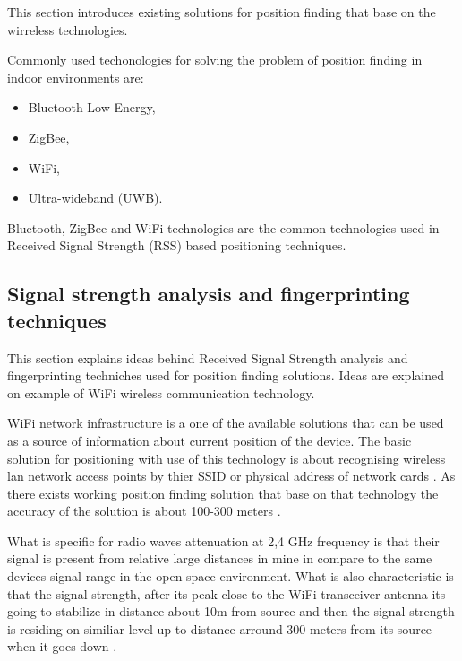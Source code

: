 \documentclass[../main.tex]{subfiles}
\begin{document}
This section introduces existing solutions for position finding that base on the wirreless technologies.

Commonly used techonologies for solving the problem of position finding in indoor environments are\cite{positioning_tests}:
\begin{itemize}
	\item Bluetooth Low Energy,
	\item ZigBee,
	\item WiFi,
	\item Ultra-wideband (UWB).
\end{itemize}

Bluetooth, ZigBee and WiFi technologies are the common technologies used in Received Signal Strength (RSS) based positioning techniques.

\subsection{Signal strength analysis and fingerprinting techniques} %
\label{sub:wifi_fingerprinting}

This section explains ideas behind Received Signal Strength analysis and fingerprinting techniches used for position finding solutions. Ideas are explained on example of WiFi wireless communication technology.

WiFi network infrastructure is a one of the available solutions that can be used as a source of information about current position of the device. The basic solution for positioning with use of this technology is about recognising wireless lan network access points by thier SSID or physical address of network cards \cite{WLAN_fingerprinting}. As there exists working position finding solution that base on that technology the accuracy of the solution is about 100-300 meters \cite{thesis_tablet_positioning}.

What is specific for radio waves attenuation at 2,4 GHz frequency is that their signal is present from relative large distances in mine in compare to the same devices signal range in the open space environment. What is also characteristic is that the signal strength, after its peak close to the WiFi transceiver antenna its going to stabilize in distance about 10m from source and then the signal strength is residing on similiar level up to distance arround 300 meters from its source when it goes down \cite{Thesis_CM}.
\end{document}
